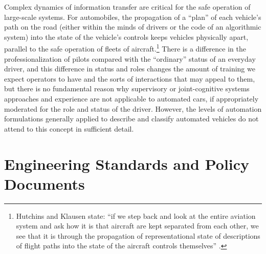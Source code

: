 

Complex dynamics of information transfer are critical
for the safe operation of large-scale systems. For automobiles, the
propagation of a ``plan'' of each 
vehicle's path on the 
road (either within the minds of drivers or the code of an
algorithmic system) into the state of the vehicle's controls keeps vehicles
physically apart, parallel to the safe operation of fleets of
aircraft.\footnote{Hutchins and
  Klausen state: ``if we step back and 
look at the entire aviation system and ask how
it is that aircraft are kept separated from each other, we see that it
is through the propagation of representational state of descriptions
of flight paths into the state of the aircraft controls
themselves'' \cite[p. 14]{hutchinsKlausen}.} There is a difference in the 
professionalization of pilots compared with the ``ordinary'' status of an
everyday driver, and this difference in status and roles
changes the amount of training we expect operators to have and the
sorts of interactions that may appeal to them, but there is no
fundamental reason why supervisory or joint-cognitive
systems approaches and
experience are not applicable to automated cars, if appropriately
moderated for the role and status of the driver. However, the levels of
automation formulations generally applied to 
describe and classify automated vehicles do not attend to this concept
in sufficient detail.


\section{Engineering Standards and Policy Documents}



